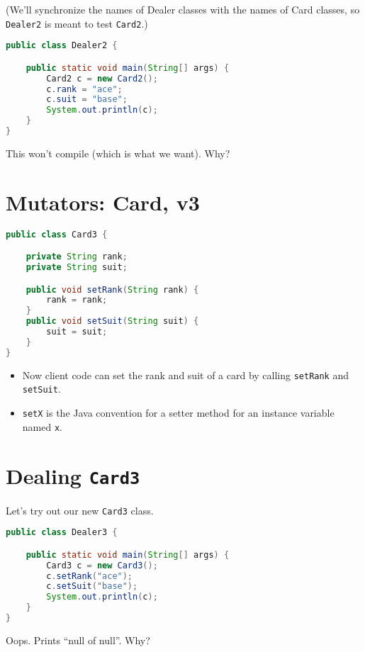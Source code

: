 \documentclass{article}
\begin{document}
(We'll synchronize the names of Dealer classes with the names of Card classes, so {\tt Dealer2} is meant to test {\tt Card2}.)
\begin{lstlisting}[language=Java]
public class Dealer2 {

    public static void main(String[] args) {
        Card2 c = new Card2();
        c.rank = "ace";
        c.suit = "base";
        System.out.println(c);
    }
}
\end{lstlisting}

This won't compile (which is what we want). Why?





\section{Mutators: Card, v3}

\begin{lstlisting}[language=Java]
public class Card3 {

    private String rank;
    private String suit;

    public void setRank(String rank) {
        rank = rank;
    }
    public void setSuit(String suit) {
        suit = suit;
    }
}
\end{lstlisting}
\begin{itemize}
\item Now client code can set the rank and suit of a card by calling {\tt setRank} and {\tt setSuit}.
\item {\tt setX} is the Java convention for a setter method for an instance variable named {\tt x}.
\end{itemize}





\section{Dealing {\tt Card3}}


Let's try out our new {\tt Card3} class.
\begin{lstlisting}[language=Java]
public class Dealer3 {

    public static void main(String[] args) {
        Card3 c = new Card3();
        c.setRank("ace");
        c.setSuit("base");
        System.out.println(c);
    }
}
\end{lstlisting}

Oops.  Prints ``null of null''.  Why?
\end{document}
